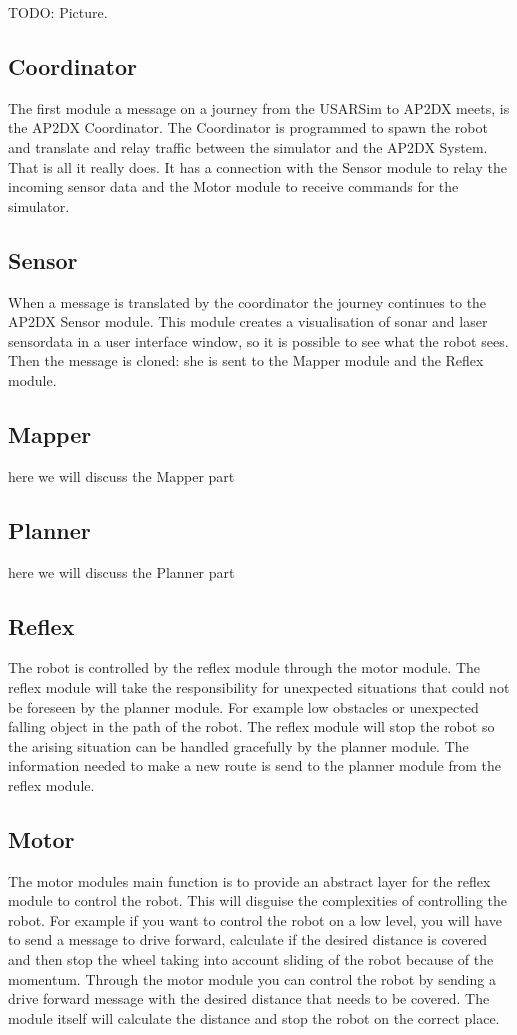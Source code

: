 \documentclass[a4paper,10pt]{article}
\begin{document}
TODO: Picture.

\subsection{Coordinator}
The first module a message on a journey from the USARSim to AP2DX meets, is the AP2DX Coordinator. The Coordinator is programmed to spawn the robot and translate and relay traffic between the simulator and the AP2DX System. That is all it really does. It has a connection with the Sensor module to relay the incoming sensor data and the Motor module to receive commands for the simulator.

\subsection{Sensor}
When a message is translated by the coordinator the journey continues to the AP2DX Sensor module. This module creates a visualisation of sonar and laser sensordata in a user interface window, so it is possible to see what the robot sees. Then the message is cloned: she is sent to the Mapper module and the Reflex module.

\subsection{Mapper}
here we will discuss the Mapper part

\subsection{Planner}
here we will discuss the Planner part

\subsection{Reflex}
The robot is controlled by the reflex module through the motor module. The reflex module will take the responsibility for unexpected situations that could not be foreseen by the planner module. For example low obstacles or unexpected falling object in the path of the robot. The reflex module will stop the robot so the arising situation can be handled gracefully by the planner module. The information needed to make a new route is send to the planner module from the reflex module.

\subsection{Motor}
The motor modules main function is to provide an abstract layer for the reflex module to control the robot. This will disguise the complexities of controlling the robot. For example if you want to control the robot on a low level, you will have to send a message to drive forward, calculate if the desired distance is covered and then stop the wheel taking into account sliding of the robot because of the momentum. Through the motor module you can control the robot by sending a drive forward message with the desired distance that needs to be covered. The module itself will calculate the distance and stop the robot on the correct place.
\end{document}
